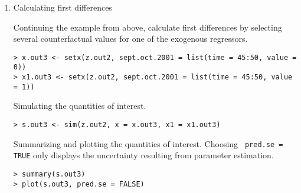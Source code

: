 \begin{enumerate}
\item Calculating first differences\newline

Continuing the example from above, calculate first differences by
selecting several counterfactual values for one of the exogenous
regressors. 
\begin{verbatim}
> x.out3 <- setx(z.out2, sept.oct.2001 = list(time = 45:50, value = 0))
> x1.out3 <- setx(z.out2, sept.oct.2001 = list(time = 45:50, value = 1))
\end{verbatim}
Simulating the quantities of interest.
\begin{verbatim}
> s.out3 <- sim(z.out2, x = x.out3, x1 = x1.out3)
\end{verbatim}
Summarizing and plotting the quantities of interest.  Choosing {\tt
pred.se = TRUE} only displays the uncertainty resulting from parameter
estimation.  
\begin{verbatim}
> summary(s.out3)
> plot(s.out3, pred.se = FALSE)
\end{verbatim}
\end{enumerate}

